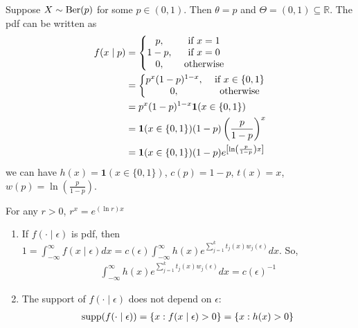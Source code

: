 \documentclass[11pt]{elegantbook}
\begin{document}
\begin{example}
    Suppose $X\sim \textnormal{Ber}(p)$ for some $p\in (0,1)$. Then $\theta=p$ and $\Theta=(0,1)\subseteq \mathbb{R}$. The pdf can be written as
    \begin{equation}
        \begin{aligned}
            f(x\mid p)&=\left\{\begin{matrix}
                p,&\textnormal{ if }x=1\\
                1-p,&\textnormal{ if }x=0\\
                0,&\textnormal{ otherwise}
            \end{matrix}\right.\\
            &=\left\{\begin{matrix}
                p^x(1-p)^{1-x},&\textnormal{ if }x\in\{0,1\}\\
                0,&\textnormal{ otherwise}
            \end{matrix}\right.\\
            &=p^x(1-p)^{1-x}\mathbf{1}(x\in\{0,1\})\\
            &=\mathbf{1}(x\in\{0,1\})(1-p)\left(\frac{p}{1-p}\right)^x\\
            &=\mathbf{1}(x\in\{0,1\})(1-p) e^{\left[\ln\left(\frac{p}{1-p}\right)x\right]}
        \end{aligned}
        \nonumber
    \end{equation}
    we can have $h(x)=\mathbf{1}(x\in\{0,1\})$, $c(p)=1-p$, $t(x)=x$, $w(p)=\ln\left(\frac{p}{1-p}\right)$.
\end{example}
\begin{note}
    For any $r>0$, $r^x=e^{(\ln r)x}$
\end{note}

\begin{proposition}
    \begin{enumerate}
        \item If $f(\cdot\mid\epsilon)$ is pdf, then $1=\int_{-\infty}^\infty f(x\mid\epsilon) dx=c(\epsilon)\int_{-\infty}^\infty h(x) e^{\sum_{j=1}^k t_j(x)w_j(\epsilon)} dx$. So,
        \begin{equation}
            \begin{aligned}
                \int_{-\infty}^\infty h(x) e^{\sum_{j=1}^k t_j(x)w_j(\epsilon)} dx=c(\epsilon)^{-1}
            \end{aligned}
            \nonumber
        \end{equation}
        \item The support of $f(\cdot\mid\epsilon)$ does not depend on $\epsilon$:
        \begin{equation}
            \begin{aligned}
                \textnormal{supp}(f(\cdot\mid\epsilon))=\{x: f(x\mid\epsilon)> 0\}=\{x: h(x)>0\}
            \end{aligned}
            \nonumber
        \end{equation}
    \end{enumerate}
\end{proposition}
\end{document}
